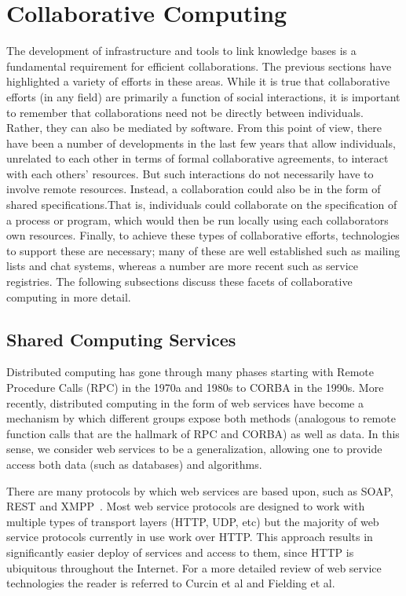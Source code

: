 \documentclass[11pt]{book}
\begin{document}
\section{Collaborative Computing}

The development of infrastructure and tools to link knowledge bases is
a fundamental requirement for efficient collaborations. The previous
sections have highlighted a variety of efforts in these areas. While
it is true that collaborative efforts (in any field) are primarily a
function of social interactions, it is important to remember that
collaborations need not be directly between individuals. Rather, they
can also be mediated by software. From this point of view, there have
been a number of developments in the last few years that allow
individuals, unrelated to each other in terms of formal collaborative
agreements, to interact with each others' resources. But such
interactions do not necessarily have to involve remote
resources. Instead, a collaboration could also be in the form of
shared specifications.That is, individuals could collaborate on the
specification of a process or program, which would then be run locally
using each collaborators own resources. Finally, to achieve these
types of collaborative efforts, technologies to support these are
necessary; many of these are well established such as mailing lists
and chat systems, whereas a number are more recent such as service
registries. The following subsections discuss these facets of
collaborative computing in more detail.

\subsection{Shared Computing Services}
\label{ref:ws}

Distributed computing has gone through many phases starting with
Remote Procedure Calls (RPC) in the 1970a and 1980s to CORBA in the
1990s. More recently, distributed computing in the form of web
services have become a mechanism by which different groups expose both
methods (analogous to remote function calls that are the hallmark of
RPC and CORBA) as well as data. In this sense, we consider web
services to be a generalization, allowing one to provide access both
data (such as databases) and algorithms.

There are many protocols by which web services are based upon, such as SOAP, REST and
XMPP~\cite{Wagener2009}. Most web service protocols are designed to
work with multiple types of transport layers (HTTP, UDP, etc) but the
majority of web service protocols currently in use work over
HTTP. This approach results in significantly easier deploy of services
and access to them, since HTTP is ubiquitous throughout the
Internet. For a more detailed review of web service technologies the
reader is referred to Curcin et al\cite{Curcin:2005fk} and Fielding et
al\cite{Fielding:2002eu}.
\end{document}
